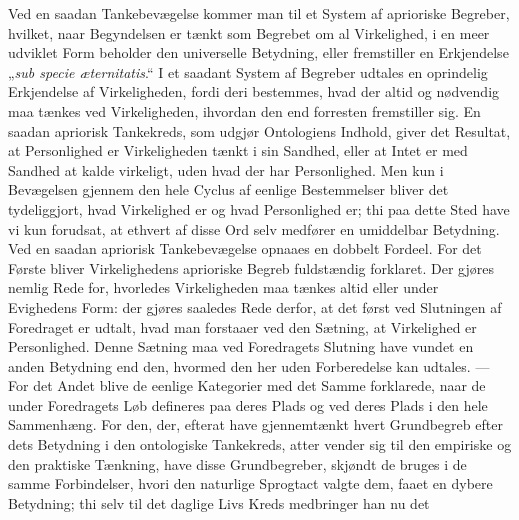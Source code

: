 \documentclass[12pt]{article}
\newcommand{\opage}[1]{\marginnote{\footnotesize\textit{[#1]}}}
\begin{document}
Ved en saadan Tankebevægelse kommer man til et System \opage{201}af aprioriske
Begreber, hvilket, naar Begyndelsen er tænkt som Begrebet om al Virkelighed, i
en meer udviklet Form beholder den universelle Betydning, eller fremstiller en
Erkjendelse „\textit{sub specie æternitatis}.“ I et saadant System af Begreber
udtales en oprindelig Erkjendelse af Virkeligheden, fordi deri bestemmes, hvad
der altid og nødvendig maa tænkes ved Virkeligheden, ihvordan den end forresten
fremstiller sig. En saadan apriorisk Tankekreds, som udgjør Ontologiens Indhold,
giver det Resultat, at Personlighed er Virkeligheden tænkt i sin Sandhed, eller
at Intet er med Sandhed at kalde virkeligt, uden hvad der har Personlighed. Men
kun i Bevægelsen gjennem den hele Cyclus af eenlige Bestemmelser bliver det
tydeliggjort, hvad Virkelighed er og hvad Personlighed er; thi paa dette Sted
have vi kun forudsat, at ethvert af disse Ord selv medfører en umiddelbar
Betydning. Ved en saadan apriorisk Tankebevægelse opnaaes en dobbelt Fordeel.
For det Første bliver Virkelighedens aprioriske Begreb fuldstændig forklaret.
Der gjøres nemlig Rede for, hvorledes Virkeligheden maa tænkes altid eller under
Evighedens Form: der gjøres saaledes Rede derfor, at det først ved Slutningen af
Foredraget er udtalt, hvad man forstaaer ved den Sætning, at Virkelighed er
Personlighed. Denne Sætning maa ved Foredragets Slutning have vundet en anden
Betydning end den, hvormed den her uden Forberedelse kan udtales. --- For det
Andet blive de eenlige Kategorier med det Samme forklarede, naar de under
Foredragets Løb defineres paa deres Plads og ved deres Plads i den hele
Sammenhæng. For den, der, efterat have gjennemtænkt hvert Grundbegreb efter dets
Betydning i den ontologiske Tankekreds, atter vender sig til den empiriske og den
praktiske Tænkning, have disse Grundbegreber, skjøndt de bruges i de samme
Forbindelser, hvori den naturlige Sprogtact valgte dem, faaet en dybere
Betydning; thi selv til det daglige Livs Kreds \opage{202}medbringer han nu det
\end{document}
